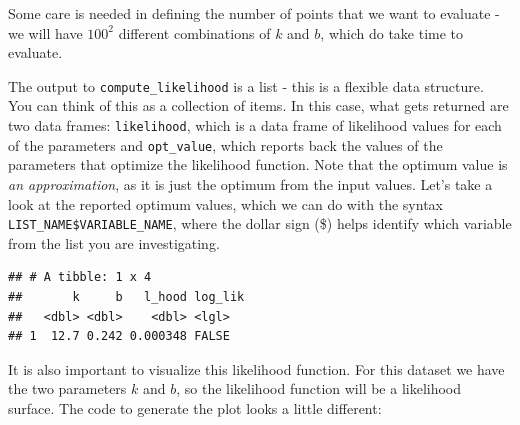 \documentclass[
]{book}
\newenvironment{Shaded}{\begin{snugshade}}{\end{snugshade}}
\newcommand{\AttributeTok}[1]{\textcolor[rgb]{0.77,0.63,0.00}{#1}}
\newcommand{\CommentTok}[1]{\textcolor[rgb]{0.56,0.35,0.01}{\textit{#1}}}
\newcommand{\FunctionTok}[1]{\textcolor[rgb]{0.00,0.00,0.00}{#1}}
\newcommand{\NormalTok}[1]{#1}
\newcommand{\OtherTok}[1]{\textcolor[rgb]{0.56,0.35,0.01}{#1}}
\newcommand{\SpecialCharTok}[1]{\textcolor[rgb]{0.00,0.00,0.00}{#1}}
\theoremstyle{definition}
\theoremstyle{definition}
\theoremstyle{definition}
\theoremstyle{remark}
\begin{document}
Some care is needed in defining the number of points that we want to evaluate - we will have \(100^{2}\) different combinations of \(k\) and \(b\), which do take time to evaluate.

The output to \texttt{compute\_likelihood} is a list - this is a flexible data structure. You can think of this as a collection of items. In this case, what gets returned are two data frames: \texttt{likelihood}, which is a data frame of likelihood values for each of the parameters and \texttt{opt\_value}, which reports back the values of the parameters that optimize the likelihood function. Note that the optimum value is \emph{an approximation}, as it is just the optimum from the input values. Let's take a look at the reported optimum values, which we can do with the syntax \texttt{LIST\_NAME\$VARIABLE\_NAME}, where the dollar sign (\$) helps identify which variable from the list you are investigating.

\begin{Shaded}
\end{Shaded}

\begin{verbatim}
## # A tibble: 1 x 4
##       k     b   l_hood log_lik
##   <dbl> <dbl>    <dbl> <lgl>  
## 1  12.7 0.242 0.000348 FALSE
\end{verbatim}

It is also important to visualize this likelihood function. For this dataset we have the two parameters \(k\) and \(b\), so the likelihood function will be a likelihood surface. The code to generate the plot looks a little different:

\begin{Shaded}
\end{Shaded}
\end{document}
